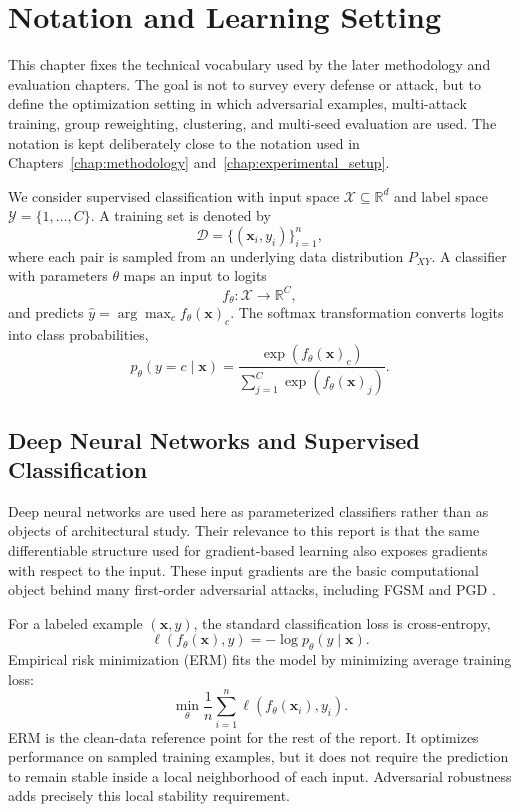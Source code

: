 \section{Notation and Learning Setting}

This chapter fixes the technical vocabulary used by the later methodology and evaluation chapters. The goal is not to survey every defense or attack, but to define the optimization setting in which adversarial examples, multi-attack training, group reweighting, clustering, and multi-seed evaluation are used. The notation is kept deliberately close to the notation used in Chapters~\ref{chap:methodology} and~\ref{chap:experimental_setup}.

We consider supervised classification with input space $\mathcal{X}\subseteq\mathbb{R}^{d}$ and label space $\mathcal{Y}=\{1,\ldots,C\}$. A training set is denoted by
\[
\mathcal{D}=\{(\mathbf{x}_i,y_i)\}_{i=1}^{n},
\]
where each pair is sampled from an underlying data distribution $P_{XY}$. A classifier with parameters $\theta$ maps an input to logits
\[
f_\theta:\mathcal{X}\rightarrow\mathbb{R}^{C},
\]
and predicts $\hat{y}=\arg\max_{c} f_\theta(\mathbf{x})_c$. The softmax transformation converts logits into class probabilities,
\[
p_\theta(y=c\mid \mathbf{x})=
\frac{\exp(f_\theta(\mathbf{x})_c)}
{\sum_{j=1}^{C}\exp(f_\theta(\mathbf{x})_j)}.
\]

\subsection{Deep Neural Networks and Supervised Classification}

Deep neural networks are used here as parameterized classifiers rather than as objects of architectural study. Their relevance to this report is that the same differentiable structure used for gradient-based learning also exposes gradients with respect to the input. These input gradients are the basic computational object behind many first-order adversarial attacks, including FGSM and PGD \cite{goodfellow2015explaining,madry2019towards}.

For a labeled example $(\mathbf{x},y)$, the standard classification loss is cross-entropy,
\[
\ell(f_\theta(\mathbf{x}),y)=-\log p_\theta(y\mid \mathbf{x}).
\]
Empirical risk minimization (ERM) fits the model by minimizing average training loss:
\[
\min_{\theta}
\frac{1}{n}\sum_{i=1}^{n}\ell(f_\theta(\mathbf{x}_i),y_i).
\]
ERM is the clean-data reference point for the rest of the report. It optimizes performance on sampled training examples, but it does not require the prediction to remain stable inside a local neighborhood of each input. Adversarial robustness adds precisely this local stability requirement.

